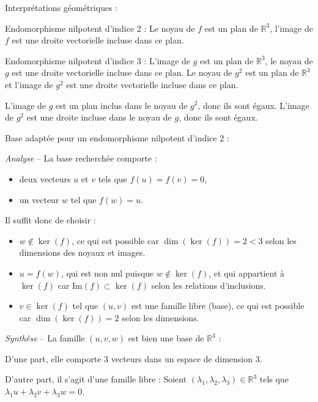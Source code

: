 \documentclass[10pt,a4paper]{article}
\begin{document}
\q Interprétations géométriques :

Endomorphisme nilpotent d'indice 2 : Le noyau de \(f\) est un plan de \(\mathbb{R}^3\),
l'image de \(f\) est une droite vectorielle incluse dans ce plan.

Endomorphisme nilpotent d'indice 3 : L'image de \(g\) est un plan de \(\mathbb{R}^3\), le noyau de
\(g\) est une droite vectorielle incluse dans ce plan. Le noyau de \(g^2\) est un plan de
\(\mathbb{R}^3\) et l'image de \(g^2\) est une droite vectorielle incluse dans ce plan.

L'image de \(g\) est un plan inclus dans le noyau de \(g^2\), donc ils sont égaux. L'image de
\(g^2\) est une droite incluse dans le noyau de \(g\), donc ils sont égaux.

\q Base adaptée pour un endomorphisme nilpotent d'indice 2 :

\textit{Analyse} -- La base recherchée comporte :
\begin{itemize}
 \item deux vecteurs \(u\) et \(v\) tels que \( f(u) = f(v) = 0\),
 \item un vecteur \(w \) tel que \(f(w) = u\).
\end{itemize}
Il suffit donc de choisir  :
\begin{itemize}
 \item \(w \notin \ker(f)\), ce qui est possible car \(\dim(\ker(f)) = 2 < 3\) selon les dimensions
 des noyaux et images.
 \item \(u = f(w)\), qui est non nul puisque \(w \notin \ker(f)\), et qui appartient
 à \(\ker(f)\) car \(\mathrm{Im}(f) \subset \ker(f)\) selon les relations d'inclusions.
 \item \(v \in \ker(f)\) tel que \((u,v)\) est une famille libre
 (base), ce qui est possible car \(\dim(\ker(f)) = 2\) selon les dimensions.
 \end{itemize}

\medskip

\textit{Synthèse} -- La famille \((u,v, w)\) est bien une base de \(\mathbb{R}^3\) :

D'une part, elle comporte 3 vecteurs dans un espace de dimension 3.

D'autre part, il s'agit d'une famille libre : Soient \((\lambda_1, \lambda_2, \lambda_3) \in \mathbb{R}^3\) tels que \(\lambda_1 u + \lambda_2 v
+ \lambda_3 w = 0\).
\end{document}
